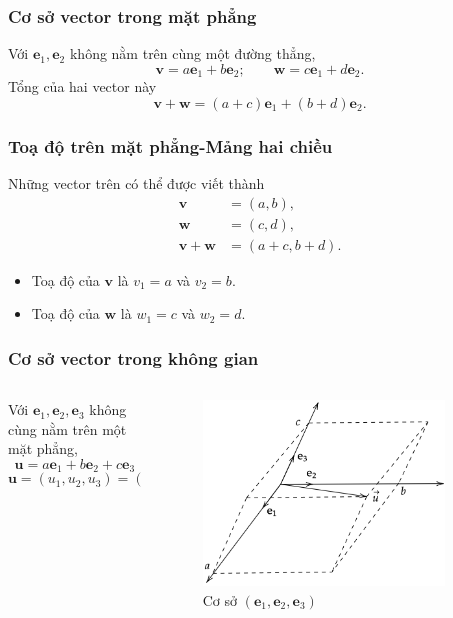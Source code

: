 \begin{frame}
    \frametitle{Cơ sở vector trong mặt phẳng}
    Với \(\mathbf{e}_1 ,\mathbf{e}_2\) không nằm trên cùng một đường thẳng,
    \[\mathbf{v}=a\mathbf{e}_1 +b\mathbf{e}_2 ; \qquad \mathbf{w}=c\mathbf{e}_1 +d\mathbf{e}_2 .\]
    Tổng của hai vector này \[\mathbf{v}+\mathbf{w}=(a+c)\mathbf{e}_1 +(b+d)\mathbf{e}_2 .\]
\end{frame}
\begin{frame}
    \frametitle{Toạ độ trên mặt phẳng-Mảng hai chiều}
    Những vector trên có thể được viết thành
    \begin{align*}
    \mathbf{v} &= (a,b),\\
    \mathbf{w} &= (c,d),\\
    \mathbf{v}+\mathbf{w} &= (a+c,b+d).
    \end{align*}
    \begin{itemize}
        \item Toạ độ của \(\mathbf{v}\) là \(v_1 =a\) và \(v_2 =b\).
        \item Toạ độ của \(\mathbf{w}\) là \(w_1 =c\) và \(w_2 =d\).
    \end{itemize}
\end{frame}
\begin{frame}
\frametitle{Cơ sở vector trong không gian}
\begin{columns}
\begin{column}{0.5\textwidth}
Với \(\mathbf{e}_1 ,\mathbf{e}_2 ,\mathbf{e}_3\) không cùng nằm trên một mặt phẳng, 
\begin{equation}
    \mathbf{u}=a\mathbf{e}_1+b\mathbf{e}_2+c\mathbf{e}_3
\end{equation}
\[\mathbf{u}=(u_1 ,u_2 ,u_3)=(a,b,c).\]
\end{column}
\begin{column}{0.5\textwidth}
\begin{figure}
\centering
\includegraphics[width=0.9\textwidth]{Slides/Figure/cosovector.png}
\caption{Cơ sở \((\mathbf{e}_1, \mathbf{e}_2, \mathbf{e}_3)\)}
\end{figure}
\end{column}
\end{columns}
\end{frame}
